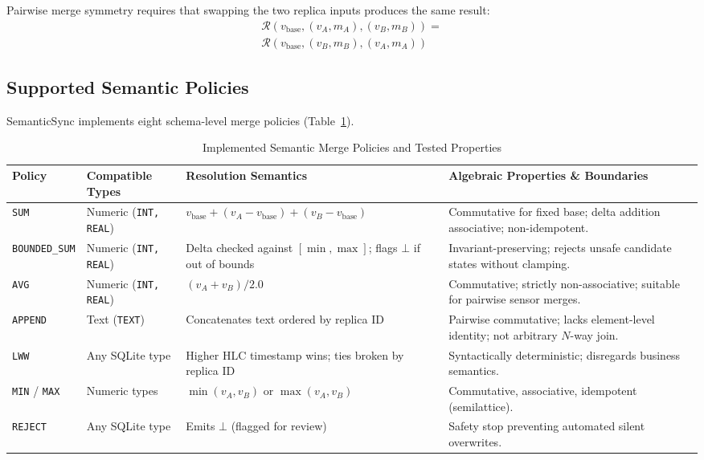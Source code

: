 \documentclass[conference]{IEEEtran}
\begin{document}
Pairwise merge symmetry requires that swapping the two replica inputs produces the same result:
\begin{equation}
\begin{aligned}
\mathcal{R}(v_{\text{base}}, (v_A, m_A), (v_B, m_B)) = \\
\mathcal{R}(v_{\text{base}}, (v_B, m_B), (v_A, m_A))
\end{aligned}
\end{equation}

\subsection{Supported Semantic Policies}
SemanticSync implements eight schema-level merge policies (Table~\ref{tab:policies}).

\begin{table}[!t]
\centering
\footnotesize
\setlength{\tabcolsep}{4pt}
\caption{Implemented Semantic Merge Policies and Tested Properties}
\label{tab:policies}
\begin{tabular}{p{}p{}p{}p{}}
\toprule
\textbf{Policy} & \textbf{Compatible Types} & \textbf{Resolution Semantics} & \textbf{Algebraic Properties \& Boundaries} \\
\midrule
\texttt{SUM} & Numeric (\texttt{INT, REAL}) & $v_{\text{base}} + (v_A - v_{\text{base}}) + (v_B - v_{\text{base}})$ & Commutative for fixed base; delta addition associative; non-idempotent. \\
\texttt{BOUNDED\_SUM} & Numeric (\texttt{INT, REAL}) & Delta checked against $[\min, \max]$; flags $\bot$ if out of bounds & Invariant-preserving; rejects unsafe candidate states without clamping. \\
\texttt{AVG} & Numeric (\texttt{INT, REAL}) & $(v_A + v_B) / 2.0$ & Commutative; strictly non-associative; suitable for pairwise sensor merges. \\
\texttt{APPEND} & Text (\texttt{TEXT}) & Concatenates text ordered by replica ID & Pairwise commutative; lacks element-level identity; not arbitrary $N$-way join. \\
\texttt{LWW} & Any SQLite type & Higher HLC timestamp wins; ties broken by replica ID & Syntactically deterministic; disregards business semantics. \\
\texttt{MIN} / \texttt{MAX} & Numeric types & $\min(v_A, v_B)$ or $\max(v_A, v_B)$ & Commutative, associative, idempotent (semilattice). \\
\texttt{REJECT} & Any SQLite type & Emits $\bot$ (flagged for review) & Safety stop preventing automated silent overwrites. \\
\bottomrule
\end{tabular}
\end{table}
\end{document}
